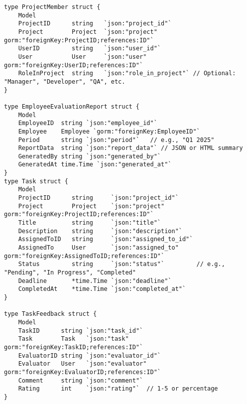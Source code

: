 \begin{lstlisting}[language=Golang, caption=Models, frame=single]
type ProjectMember struct {
	Model
	ProjectID      string   `json:"project_id"`
	Project        Project  `json:"project" gorm:"foreignKey:ProjectID;references:ID"`
	UserID         string   `json:"user_id"`
	User           User     `json:"user" gorm:"foreignKey:UserID;references:ID"`
	RoleInProject  string   `json:"role_in_project"` // Optional: "Manager", "Developer", "QA", etc.
}

type EmployeeEvaluationReport struct {
	Model
	EmployeeID  string `json:"employee_id"`
	Employee    Employee `gorm:"foreignKey:EmployeeID"`
	Period      string `json:"period"`   // e.g., "Q1 2025"
	ReportData  string `json:"report_data"` // JSON or HTML summary
	GeneratedBy string `json:"generated_by"`
	GeneratedAt time.Time `json:"generated_at"`
}
type Task struct {
	Model
	ProjectID      string     `json:"project_id"`
	Project        Project    `json:"project" gorm:"foreignKey:ProjectID;references:ID"`
	Title          string     `json:"title"`
	Description    string     `json:"description"`
	AssignedToID   string     `json:"assigned_to_id"`
	AssignedTo     User       `json:"assigned_to" gorm:"foreignKey:AssignedToID;references:ID"`
	Status         string     `json:"status"`         // e.g., "Pending", "In Progress", "Completed"
	Deadline       *time.Time `json:"deadline"`
	CompletedAt    *time.Time `json:"completed_at"`
}

type TaskFeedback struct {
	Model
	TaskID      string `json:"task_id"`
	Task        Task   `json:"task" gorm:"foreignKey:TaskID;references:ID"`
	EvaluatorID string `json:"evaluator_id"`
	Evaluator   User   `json:"evaluator" gorm:"foreignKey:EvaluatorID;references:ID"`
	Comment     string `json:"comment"`
	Rating      int    `json:"rating"`  // 1-5 or percentage
}


\end{lstlisting}

